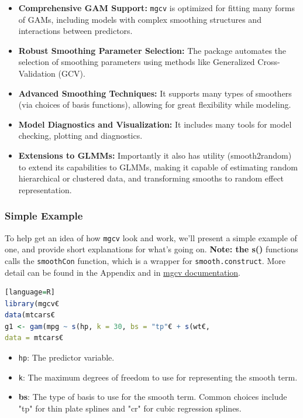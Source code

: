 \documentclass[12pt, twoside,hidelinks]{article}
\theoremstyle{definition}
\numberwithin{equation}{section}
\begin{document}
\begin{itemize}
    \item \textbf{Comprehensive GAM Support:} \texttt{mgcv} is optimized for fitting many forms of GAMs, including models with complex smoothing structures and interactions between predictors.
    
    \item \textbf{Robust Smoothing Parameter Selection:} The package automates the selection of smoothing parameters using methods like Generalized Cross-Validation (GCV).
    
    \item \textbf{Advanced Smoothing Techniques:} It supports many types of smoothers (via choices of basis functions), allowing for great flexibility while modeling.
    
    \item \textbf{Model Diagnostics and Visualization:} It includes many tools for model checking, plotting and diagnostics.
    
    \item \textbf{Extensions to GLMMs:} Importantly it also has utility (smooth2random) to extend its capabilities to GLMMs, making it capable of estimating random hierarchical or clustered data, and transforming smooths to random effect representation.
\end{itemize}

\subsubsection{Simple Example}\label{sec:rpack:mgcv:ex}

To help get an idea of how \texttt{mgcv} look and work, we'll present a simple example of one, and provide short explanations for what's going on.
\textbf{Note: the s()} functions calls the \texttt{smoothCon} function, which is a wrapper for \texttt{smooth.construct}. More detail can be found in the Appendix and in \href{https://cran.r-project.org/web/packages/mgcv/mgcv.pdf}{mgcv documentation}.

\begin{lstlisting}[language=R][language=R]
library(mgcv€
data(mtcars€
g1 <- gam(mpg ~ s(hp, k = 30, bs = "tp"€ + s(wt€, 
data = mtcars€
\end{lstlisting}

\begin{itemize}
  \item \texttt{hp}: The predictor variable.
  \item \texttt{k}: The maximum  degrees of freedom to use for representing the smooth term.
  \item \textbf{bs}: The type of basis to use for the smooth term. Common choices include "tp" for thin plate splines and "cr" for cubic regression splines.
\end{itemize}
\end{document}
